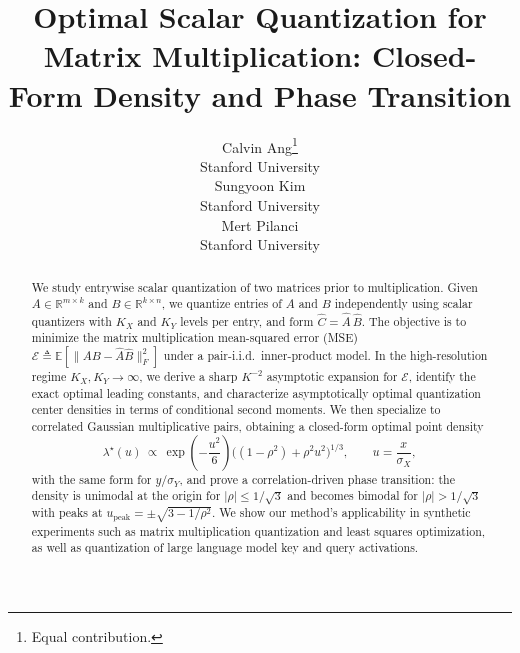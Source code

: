 \documentclass{article}
\title{Optimal Scalar Quantization for Matrix Multiplication: Closed-Form Density and Phase Transition}
\author{%
  Calvin Ang\thanks{Equal contribution.} \\
  Stanford University \\
  \And
  Sungyoon Kim\footnotemark[1] \\
  Stanford University \\
  \And
  Mert Pilanci \\
  Stanford University \\
}
\newcommand{\E}{\mathbb{E}}
\newcommand{\R}{\mathbb{R}}
\newcommand{\abs}[1]{\left\lvert #1 \right\rvert}
\newcommand{\defeq}{\triangleq}
\begin{document}
\maketitle

\begin{abstract}
We study entrywise scalar quantization of two matrices prior to multiplication. Given $A\in\R^{m\times k}$ and $B\in\R^{k\times n}$, we quantize entries of $A$ and $B$ independently using scalar quantizers with $K_X$ and $K_Y$ levels per entry, and form $\widehat C=\widehat A\,\widehat B$. The objective is to minimize the matrix multiplication mean-squared error (MSE) $\mathcal{E}\defeq \E[\|{AB-\widehat A\widehat B}\|_F^2]$ under a pair-i.i.d.\ inner-product model.
In the high-resolution regime $K_X,K_Y\to\infty$, we derive a sharp $K^{-2}$ asymptotic expansion for $\mathcal{E}$, identify the exact optimal leading constants, and characterize asymptotically optimal quantization center densities in terms of conditional second moments. We then specialize to correlated Gaussian multiplicative pairs, obtaining a closed-form optimal point density
\[
\lambda^\star(u)\ \propto\ \exp\!\left(-\frac{u^2}{6}\right)\bigl((1-\rho^2)+\rho^2u^2\bigr)^{1/3},
\qquad u=\frac{x}{\sigma_X},
\]
with the same form for $y/\sigma_Y$, and prove a correlation-driven phase transition: the density is unimodal at the origin for $\abs{\rho}\le 1/\sqrt{3}$ and becomes bimodal for $\abs{\rho}>1/\sqrt{3}$ with peaks at $u_{\mathrm{peak}}=\pm\sqrt{3-1/\rho^2}$. We show our method's applicability in synthetic experiments such as matrix multiplication quantization and least squares optimization, as well as quantization of large language model key and query activations.
\end{abstract}
\end{document}
